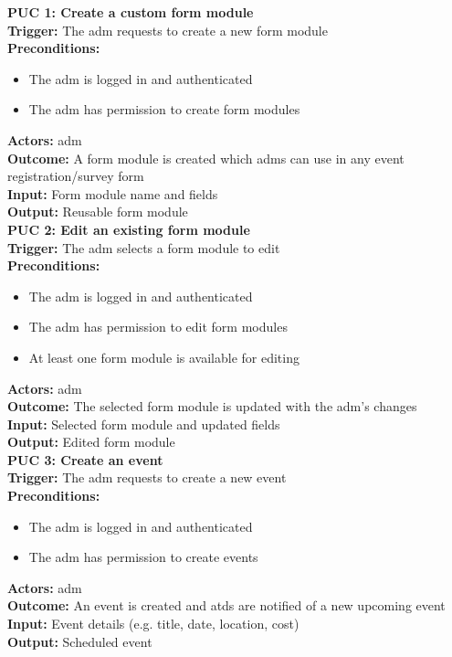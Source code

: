 \documentclass[12pt]{article}
\begin{document}
{\setlength{\parindent}{0pt}
\textbf{PUC 1: Create a custom form module} \\
\textbf{Trigger:} The \gls{adm} requests to create a new form module \\
\textbf{Preconditions:}
\begin{itemize}
  \item The \gls{adm} is logged in and authenticated
  \item The \gls{adm} has permission to create form modules
\end{itemize}
\textbf{Actors:} \Gls{adm} \\
\textbf{Outcome:} A form module is created which \glspl{adm} can use in any event registration/survey form \\
\textbf{Input:} Form module name and fields \\
\textbf{Output:} Reusable form module \\[1em]

\textbf{PUC 2: Edit an existing form module} \\
\textbf{Trigger:} The \gls{adm} selects a form module to edit \\
\textbf{Preconditions:}
\begin{itemize}
  \item The \gls{adm} is logged in and authenticated
  \item The \gls{adm} has permission to edit form modules
  \item At least one form module is available for editing
\end{itemize}
\textbf{Actors:} \Gls{adm} \\
\textbf{Outcome:} The selected form module is updated with the \gls{adm}’s changes \\
\textbf{Input:} Selected form module and updated fields \\
\textbf{Output:} Edited form module \\[1em]

\textbf{PUC 3: Create an event} \\
\textbf{Trigger:} The \gls{adm} requests to create a new event \\
\textbf{Preconditions:}
\begin{itemize}
  \item The \gls{adm} is logged in and authenticated
  \item The \gls{adm} has permission to create events
\end{itemize}
\textbf{Actors:} \Gls{adm} \\
\textbf{Outcome:} An event is created and \glspl{atd} are notified of a new upcoming event \\
\textbf{Input:} Event details (e.g. title, date, location, cost) \\
\textbf{Output:} Scheduled event \\[1em]

}
\end{document}
